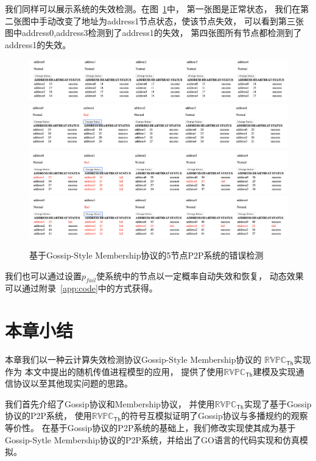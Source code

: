 我们同样可以展示系统的失效检测。在图~\ref{fig:demo_2}中，
第一张图是正常状态，
我们在第二张图中手动改变了地址为address1节点状态，使该节点失效，
可以看到第三张图中address0,address3检测到了address1的失效，
第四张图所有节点都检测到了address1的失效。
 \begin{figure}[!htp]
   \begin{minipage}{0.9\textwidth}
     \centering
     \includegraphics[width=15cm]{../figure/demo/0.png}
     \\
     \includegraphics[width=15cm]{../figure/demo/1.png}
     \\
     \includegraphics[width=15cm]{../figure/demo/2.png}
     \\
     \includegraphics[width=15cm]{../figure/demo/3.png}
   \end{minipage}
   \caption{基于Gossip-Style Membership协议的5节点P2P系统的错误检测}
   \label{fig:demo_2}   
\end{figure}

我们也可以通过设置$p_{fail}$使系统中的节点以一定概率自动失效和恢复，
动态效果可以通过附录~\ref{app:code}中的方式获得。

 \section{本章小结}
 本章我们以一种云计算失效检测协议Gossip-Style Membership协议的
 $\mathbb{RVPC}_{\mathsf{Th}}$实现作为
 本文中提出的随机传值进程模型的应用，
 提供了使用$\mathbb{RVPC}_{\mathsf{Th}}$建模及实现通信协议以至其他现实问题的思路。

 我们首先介绍了Gossip协议和Membership协议，
并使用$\mathbb{RVPC}_{\mathsf{Th}}$实现了基于Gossip协议的P2P系统，
使用$\mathbb{RVPC}_{\mathsf{Th}}$的符号互模拟证明了Gossip协议与多播规约的观察等价性。
在基于Gossip协议的P2P系统的基础上，我们修改实现使其成为基于
Gossip-Sytle Membership协议的P2P系统，并给出了GO语言的代码实现和仿真模拟。
